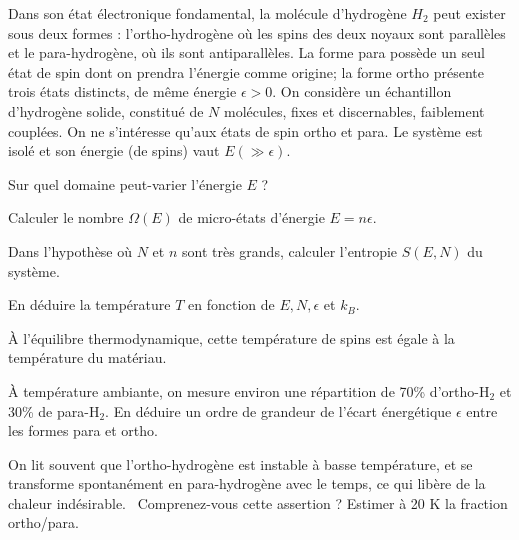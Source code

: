 Dans son état électronique fondamental, la molécule d'hydrogène $H_2$ peut exister sous deux formes : l'ortho-hydrogène où les spins des deux noyaux sont parallèles et le para-hydrogène, où ils sont antiparallèles. La forme para possède un seul état de spin dont on prendra l'énergie comme origine; la forme ortho présente trois états distincts, de même énergie $\epsilon >0$. On considère un échantillon d'hydrogène solide, constitué de $N$ molécules, fixes et discernables, faiblement couplées. On ne s'intéresse qu'aux états de spin ortho et para. Le système est isolé et son énergie (de spins) vaut $E (\gg \epsilon)$.

\question
Sur quel domaine peut-varier l'énergie $E$ ?

\question
Calculer le nombre $\Omega(E)$ de micro-états d'énergie $E = n \epsilon$.

\question
Dans l'hypothèse où $N$ et $n$ sont très grands, calculer l'entropie $S(E,N)$ du système.

\question
En déduire la température $T$ en fonction de $E, N, \epsilon$ et $k_B$.

\medskip

\`A l'équilibre thermodynamique, cette température de spins est égale à la température du matériau.

\question
\`A température ambiante, on mesure environ une répartition de 70\% d'ortho-H$_2$ et 30\% de para-H$_2$. En déduire un ordre de grandeur de l'écart énergétique $\epsilon$ entre les formes para et ortho.

\question
On lit souvent que \og l'ortho-hydrogène est instable à basse température, et se transforme spontanément en para-hydrogène avec le temps, ce qui libère de la chaleur indésirable. \fg \ Comprenez-vous cette assertion ? Estimer à 20 K la fraction ortho/para.
